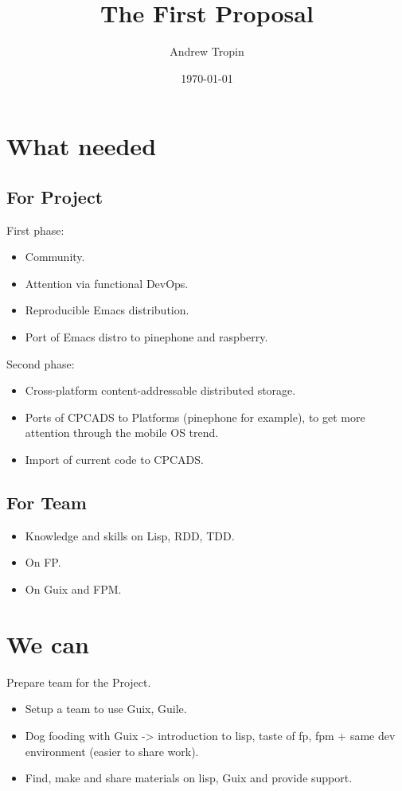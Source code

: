 \documentclass[11pt]{report}
\author{Andrew Tropin}
\date{\today}
\title{The First Proposal}
\begin{document}
\maketitle
\tableofcontents


\part{What needed}
\label{sec:org5d1179e}
\chapter{For Project}
\label{sec:org6f603c5}
First phase:
\begin{itemize}
\item Community.
\item Attention via functional DevOps.
\item Reproducible Emacs distribution.
\item Port of Emacs distro to pinephone and raspberry.
\end{itemize}

Second phase:
\begin{itemize}
\item Cross-platform content-addressable distributed storage.
\item Ports of CPCADS to Platforms (pinephone for example), to get more attention through the mobile OS trend.
\item Import of current code to CPCADS.
\end{itemize}

\chapter{For Team}
\label{sec:org3aeaa0a}
\begin{itemize}
\item Knowledge and skills on Lisp, RDD, TDD.
\item On FP.
\item On Guix and FPM.
\end{itemize}

\part{We can}
\label{sec:org6bb4aed}
Prepare team for the Project.
\begin{itemize}
\item Setup a team to use Guix, Guile.
\item Dog fooding with Guix -> introduction to lisp, taste of fp, fpm + same dev
environment (easier to share work).
\item Find, make and share materials on lisp, Guix and provide support.
\end{itemize}
\end{document}

